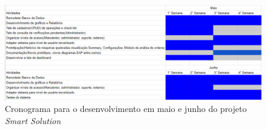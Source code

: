 \begin{figure}[H]
	\caption{\label{Cronograma_maio_e_Junho}Cronograma para o desenvolvimento em maio e junho do projeto \textit{Smart Solution}}
	\begin{center}
		\includegraphics[scale=0.85,angle=90]{./Figuras/Cronograma_maio_e_Junho}
	\end{center}
	
\end{figure}
